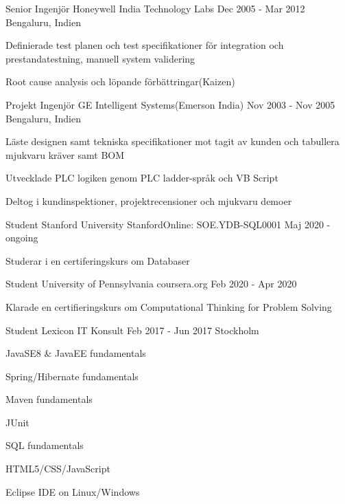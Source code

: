 \documentclass[12pt, a4paper]{awesome-cv}
\begin{document}
\begin{cventries}
    \cventry
      {Senior Ingenjör}
      {Honeywell India Technology Labs}
      {Dec 2005 - Mar 2012}
      {Bengaluru, Indien}
      {
        \begin{cvitems}
        \item Definierade test planen och test specifikationer för integration och prestandatestning, manuell system validering
        \item Root cause analysis och löpande förbättringar(Kaizen)
        \end{cvitems}
      }

    \cventry
      {Projekt Ingenjör}
      {GE Intelligent Systems(Emerson India)}
      {Nov 2003 - Nov 2005}
      {Bengaluru, Indien}
      {
        \begin{cvitems}
        \item Läste designen samt tekniska specifikationer mot tagit av kunden och tabullera mjukvaru kräver samt BOM
        \item Utvecklade PLC logiken genom PLC ladder-språk och VB Script
        \item Deltog i kundinspektioner, projektrecensioner och mjukvaru demoer
        \end{cvitems}
      }
  \end{cventries}


  \begin{cventries}
    \cventry
    {Student}
      {Stanford University}
      {StanfordOnline: SOE.YDB-SQL0001}
      {Maj 2020 - ongoing}
      {
        \begin{cvitems}
        \item {Studerar i en certiferingskurs om Databaser}
        \end{cvitems}
      }

    \cventry
      {Student}
      {University of Pennsylvania}
      {coursera.org}
      {Feb 2020 - Apr 2020}
      {
        \begin{cvitems}
        \item {Klarade en certifieringskurs om Computational Thinking for Problem Solving}
        \end{cvitems}
      }

    \cventry
      {Student}
      {Lexicon IT Konsult}
      {Feb 2017 - Jun 2017}
      {Stockholm}
      {
        \begin{cvitems}
          \item JavaSE8 \& JavaEE fundamentals
          \item Spring/Hibernate fundamentals
          \item Maven fundamentals
          \item JUnit
          \item SQL fundamentals
          \item HTML5/CSS/JavaScript
          \item Eclipse IDE on Linux/Windows
           \end{cvitems}
      }
    \end{cventries}
\end{document}
